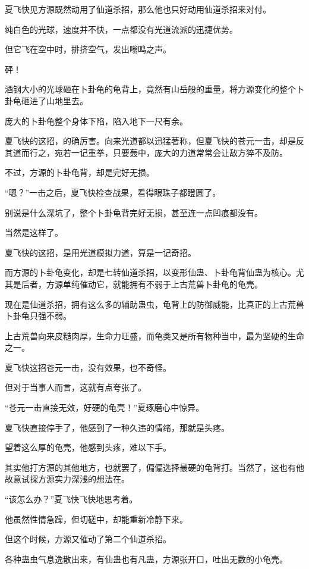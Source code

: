 
\begin{this_body}

夏飞快见方源既然动用了仙道杀招，那么他也只好动用仙道杀招来对付。

纯白色的光球，速度并不快，一点都没有光道流派的迅捷优势。

但它飞在空中时，排挤空气，发出嗡鸣之声。

砰！

酒钢大小的光球砸在卜卦龟的龟背上，竟然有山岳般的重量，将方源变化的整个卜卦龟砸进了山地里去。

庞大的卜卦龟整个身体下陷，陷入地下一尺有余。

夏飞快的这招，的确厉害。向来光道都以迅猛著称，但夏飞快的苍元一击，却是反其道而行之，宛若一记重拳，只要轰中，庞大的力道常常会让敌方猝不及防。

不过，方源的卜卦龟背，却是完好无损。

“嗯？”一击之后，夏飞快检查战果，看得眼珠子都瞪圆了。

别说是什么深坑了，整个卜卦龟背完好无损，甚至连一点凹痕都没有。

当然是这样了。

夏飞快的这招，是用光道模拟力道，算是一记奇招。

而方源的卜卦龟变化，却是七转仙道杀招，以变形仙蛊、卜卦龟背仙蛊为核心。尤其是后者，方源单纯催动它，就能拥有不弱于上古荒兽卜卦龟的龟壳。

现在是仙道杀招，拥有这么多的辅助蛊虫，龟背上的防御威能，比真正的上古荒兽卜卦龟只强不弱。

上古荒兽向来皮糙肉厚，生命力旺盛，而龟类又是所有物种当中，最为坚硬的生命之一。

夏飞快这招苍元一击，没有效果，也不奇怪。

但对于当事人而言，这就有点夸张了。

“苍元一击直接无效，好硬的龟壳！”夏琢磨心中惊异。

夏飞快直接停手了，他感到了一种久违的情绪，那就是头疼。

望着这么厚的龟壳，他感到头疼，难以下手。

其实他打方源的其他地方，也就罢了，偏偏选择最硬的龟背打。当然了，这也有他故意试探方源实力深浅的想法在。

“该怎么办？”夏飞快飞快地思考着。

他虽然性情急躁，但切磋中，却能重新冷静下来。

但这个时候，方源又催动了第二个仙道杀招。

各种蛊虫气息逸散出来，有仙蛊也有凡蛊，方源张开口，吐出无数的小龟壳。


\end{this_body}
